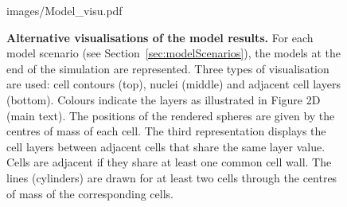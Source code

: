 \documentclass[11pt,a4paper, final]{article}
\newcommand{\TODO}[1]{
\textcolor{red}{TODO:#1}
}
\begin{document}
\begin{figure}[htbp]
\centering
	\begin{overpic}[width=0.95\linewidth]{images/Model_visu.pdf}
	\end{overpic}
\caption[Alternative visualisations of the model results.]
{{\bf Alternative visualisations of the model results.} For each model scenario (see Section~\ref{sec:modelScenarios}), the models at the end of the simulation are represented. Three types of visualisation are used: cell contours (top), nuclei (middle) and adjacent cell layers (bottom). Colours indicate the layers as illustrated in Figure 2D (main text). The positions of the rendered spheres are given by the centres of mass of each cell. The third representation displays the cell layers between adjacent cells that share the same layer value. Cells are adjacent if they share at least one common cell wall. The lines (cylinders) are drawn for at least two cells through the centres of mass of the corresponding cells.
}
\label{fig:visumodel}
\end{figure}
%
%
\end{document}
